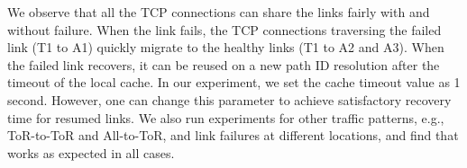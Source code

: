 We observe that all the TCP connections can share the links fairly with and without failure. When the link fails, the TCP connections traversing the failed link (T1 to A1) quickly migrate to the healthy links (T1 to A2 and A3). When the failed link recovers, it can be reused on a new path ID resolution after the timeout of the local cache. In our experiment, we set the cache timeout value as 1 second. However, one can change this parameter to achieve satisfactory recovery time for resumed links. We also run experiments for other traffic patterns, e.g., ToR-to-ToR and All-to-ToR, and link failures at different locations, and find that \sys works as expected in all cases.

%
%
%








